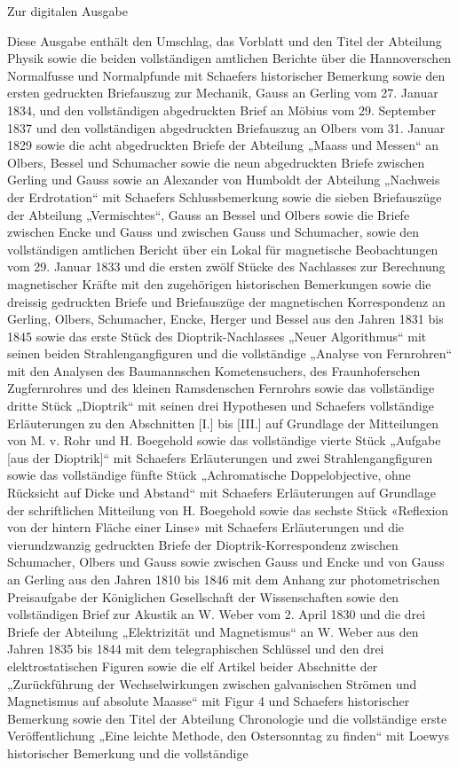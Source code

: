 \clearpage\NoSourceHead
\begin{center}\large Zur digitalen Ausgabe\end{center}
Diese Ausgabe enthält den Umschlag, das Vorblatt und den Titel der Abteilung Physik sowie die beiden vollständigen amtlichen Berichte über die Hannoverschen Normalfusse und Normalpfunde mit Schaefers historischer Bemerkung sowie den ersten gedruckten Briefauszug zur Mechanik, Gauss an Gerling vom 27. Januar 1834, und den vollständigen abgedruckten Brief an Möbius vom 29. September 1837 und den vollständigen abgedruckten Briefauszug an Olbers vom 31. Januar 1829 sowie die acht abgedruckten Briefe der Abteilung „Maass und Messen“ an Olbers, Bessel und Schumacher sowie die neun abgedruckten Briefe zwischen Gerling und Gauss sowie an Alexander von Humboldt der Abteilung „Nachweis der Erdrotation“ mit Schaefers Schlussbemerkung sowie die sieben Briefauszüge der Abteilung „Vermischtes“, Gauss an Bessel und Olbers sowie die Briefe zwischen Encke und Gauss und zwischen Gauss und Schumacher, sowie den vollständigen amtlichen Bericht über ein Lokal für magnetische Beobachtungen vom 29. Januar 1833 und die ersten zwölf Stücke des Nachlasses zur Berechnung magnetischer Kräfte mit den zugehörigen historischen Bemerkungen sowie die dreissig gedruckten Briefe und Briefauszüge der magnetischen Korrespondenz an Gerling, Olbers, Schumacher, Encke, Herger und Bessel aus den Jahren 1831 bis 1845 sowie das erste Stück des Dioptrik-Nachlasses „Neuer Algorithmus“ mit seinen beiden Strahlengangfiguren und die vollständige „Analyse von Fernrohren“ mit den Analysen des Baumannschen Kometensuchers, des Fraunhoferschen Zugfernrohres und des kleinen Ramsdenschen Fernrohrs sowie das vollständige dritte Stück „Dioptrik“ mit seinen drei Hypothesen und Schaefers vollständige Erläuterungen zu den Abschnitten [I.] bis [III.] auf Grundlage der Mitteilungen von M. v. Rohr und H. Boegehold sowie das vollständige vierte Stück „Aufgabe [aus der Dioptrik]“ mit Schaefers Erläuterungen und zwei Strahlengangfiguren sowie das vollständige fünfte Stück „Achromatische Doppelobjective, ohne Rücksicht auf Dicke und Abstand“ mit Schaefers Erläuterungen auf Grundlage der schriftlichen Mitteilung von H. Boegehold sowie das sechste Stück «Reflexion von der hintern Fläche einer Linse» mit Schaefers Erläuterungen und die vierundzwanzig gedruckten Briefe der Dioptrik-Korrespondenz zwischen Schumacher, Olbers und Gauss sowie zwischen Gauss und Encke und von Gauss an Gerling aus den Jahren 1810 bis 1846 mit dem Anhang zur photometrischen Preisaufgabe der Königlichen Gesellschaft der Wissenschaften sowie den vollständigen Brief zur Akustik an W. Weber vom 2. April 1830 und die drei Briefe der Abteilung „Elektrizität und Magnetismus“ an W. Weber aus den Jahren 1835 bis 1844 mit dem telegraphischen Schlüssel und den drei elektrostatischen Figuren sowie die elf Artikel beider Abschnitte der „Zurückführung der Wechselwirkungen zwischen galvanischen Strömen und Magnetismus auf absolute Maasse“ mit Figur 4 und Schaefers historischer Bemerkung sowie den Titel der Abteilung Chronologie und die vollständige erste Veröffentlichung „Eine leichte Methode, den Ostersonntag zu finden“ mit Loewys historischer Bemerkung und die vollständige 